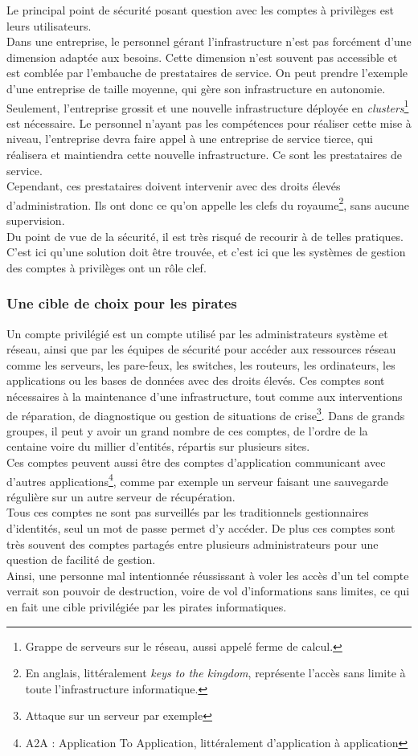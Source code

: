 Le principal point de sécurité posant question avec les comptes à privilèges est leurs utilisateurs.\\
Dans une entreprise, le personnel gérant l'infrastructure n'est pas forcément d'une dimension adaptée aux besoins. Cette dimension n'est souvent pas accessible et est comblée par l'embauche de prestataires de service. On peut prendre l'exemple d'une entreprise de taille moyenne, qui gère son infrastructure en autonomie. Seulement, l'entreprise grossit et une nouvelle infrastructure déployée en \emph{clusters}\footnote{Grappe de serveurs sur le réseau, aussi appelé ferme de calcul.} est nécessaire. Le personnel n'ayant pas les compétences pour réaliser cette mise à niveau, l'entreprise devra faire appel à une entreprise de service tierce, qui réalisera et maintiendra cette nouvelle infrastructure. Ce sont les prestataires de service.\\
Cependant, ces prestataires doivent intervenir avec des droits élevés d'administration. Ils ont donc ce qu'on appelle les clefs du royaume\footnote{En anglais, littéralement \emph{keys to the kingdom}, représente l'accès sans limite à toute l'infrastructure informatique.}, sans aucune supervision.\\
Du point de vue de la sécurité, il est très risqué de recourir à de telles pratiques. C'est ici qu'une solution doit être trouvée, et c'est ici que les systèmes de gestion des comptes à privilèges ont un rôle clef.

\subsubsection{Une cible de choix pour les pirates}
Un compte privilégié est un compte utilisé par les administrateurs système et réseau, ainsi que par les équipes de sécurité pour accéder aux ressources réseau comme les serveurs, les pare-feux, les switches, les routeurs, les ordinateurs, les applications ou les bases de données avec des droits élevés. Ces comptes sont nécessaires à la maintenance d'une infrastructure, tout comme aux interventions de réparation, de diagnostique ou gestion de situations de crise\footnote{Attaque sur un serveur par exemple}. Dans de grands groupes, il peut y avoir un grand nombre de ces comptes, de l'ordre de la centaine voire du millier d'entités, répartis sur plusieurs sites.\\
Ces comptes peuvent aussi être des comptes d'application communicant avec d'autres applications\footnote{A2A : Application To Application, littéralement d'application à application}, comme par exemple un serveur faisant une sauvegarde régulière sur un autre serveur de récupération.\\
Tous ces comptes ne sont pas surveillés par les traditionnels gestionnaires d'identités, seul un mot de passe permet d'y accéder. De plus ces comptes sont très souvent des comptes partagés entre plusieurs administrateurs pour une question de facilité de gestion.\\
Ainsi, une personne mal intentionnée réussissant à voler les accès d'un tel compte verrait son pouvoir de destruction, voire de vol d'informations sans limites, ce qui en fait une cible privilégiée par les pirates informatiques.

